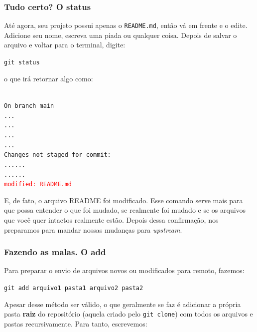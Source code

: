 \documentclass{article}
\begin{document}
  \subsubsection{Tudo certo? O status}

  Até agora, seu projeto possui apenas o \texttt{README.md}, então vá em frente e o edite. Adicione seu nome, escreva uma piada ou 
  qualquer coisa. Depois de salvar o arquivo e voltar para o terminal, digite: 

  \vspace{1ex}
  \texttt{git status}
  \vspace{1ex}

  o que irá retornar algo como: 

  \vspace{1ex}
  \texttt{\\
  \noindent On branch main\\
  \noindent ...\\
  \noindent ...\\
  \noindent ...\\
  \noindent ...\\
  \noindent Changes not staged for commit:\\
  \noindent ......\\
  \noindent ......\\
  \noindent \textcolor{red}{modified:   README.md}}
  \vspace{1ex}


  E, de fato, o arquivo README foi modificado. Esse comando serve mais para que possa entender o que foi mudado, se realmente foi 
  mudado e se os arquivos que você quer intactos realmente estão. Depois dessa confirmação, nos preparamos para mandar nossas
  mudanças para \textit{upstream}. 
  
  \subsubsection{Fazendo as malas. O add}
  \label{sec:add}

  Para preparar o envio de arquivos novos ou modificados para remoto, fazemos: 
  
  \vspace{1ex}
  \texttt{git add arquivo1 pasta1 arquivo2 pasta2}
  \vspace{1ex}
  
  Apesar desse método ser válido, o que geralmente se faz é adicionar a própria pasta \textbf{raiz} do repositório (aquela criado pelo \texttt{git clone})
  com todos os arquivos e pastas recursivamente. Para tanto, escrevemos: 
\end{document}
